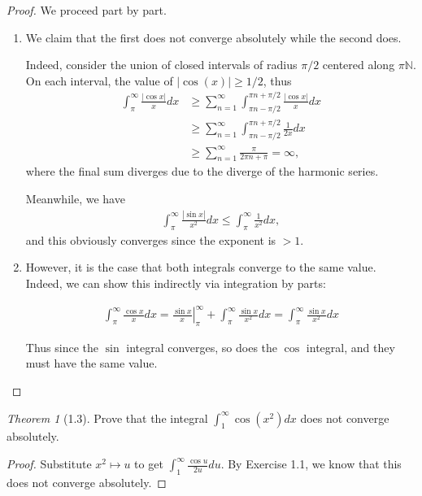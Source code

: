 \documentclass[12pt]{article}
\theoremstyle{remark}
\theoremstyle{named}
\newtheorem*{theorem}{Theorem}
\begin{document}
\begin{proof}
    We proceed part by part.
    \begin{enumerate}
        \item We claim that the first does not converge absolutely while the second does. 
        
        Indeed, consider the union of closed intervals of radius \(\pi/2\) centered along \(\pi\mathbb{N}\). On each interval, the value of \(|\cos(x)| \geq 1/2\), thus 
        \begin{align*}
            \int_{\pi}^{\infty} \frac{|\cos x|}{x} dx &\geq \sum_{n = 1}^\infty \int_{\pi n - \pi/2}^{\pi n + \pi/2} \frac{|\cos x|}{x} dx \\
            &\geq \sum_{n = 1}^\infty \int_{\pi n - \pi/2}^{\pi n + \pi/2} \frac{1}{2x} dx \\
            &\geq \sum_{n = 1}^\infty \frac{\pi}{2\pi n + \pi} = \infty,
        \end{align*}
        where the final sum diverges due to the diverge of the harmonic series.

        Meanwhile, we have
        \begin{align*}
            \int_{\pi}^{\infty} \frac{|\sin x|}{x^2} dx \leq \int_{\pi}^{\infty} \frac{1}{x^2}dx,
        \end{align*}
        and this obviously converges since the exponent is \(> 1\).

        \item However, it is the case that both integrals converge to the same value. Indeed, we can show this indirectly via integration by parts:
        
        \begin{align*}
            \int_{\pi}^{\infty} \frac{\cos x}{x} dx = \left. \frac{\sin x}{x}\right|_\pi^\infty+\int_\pi^\infty \frac{\sin x}{x^2}dx = \int_\pi^\infty \frac{\sin x}{x^2}dx
        \end{align*}

        Thus since the \(\sin\) integral converges, so does the \(\cos\) integral, and they must have the same value.
    \end{enumerate}
\end{proof}

\begin{theorem}[1.3]
    Prove that the integral \(\int_{1}^{\infty}\cos(x^2)dx\) does not converge absolutely.
\end{theorem}

\begin{proof}
    Substitute \(x^2 \mapsto u\) to get \(\int_{1}^{\infty}\frac{\cos u}{2 u} du\). By Exercise 1.1, we know that this does not converge absolutely.
\end{proof}
\end{document}
